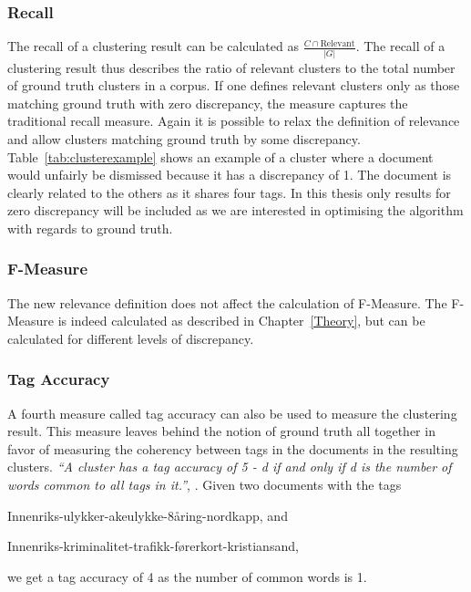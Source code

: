 \subsubsection{Recall}
The recall of a clustering result can be calculated as \(\frac{C \cap \text{Relevant}}{\vert G \vert}\). The recall of a clustering result thus describes the ratio of relevant clusters to the total number of ground truth clusters in a corpus. If one defines relevant clusters only as those matching ground truth with zero discrepancy, the measure captures the traditional recall measure. Again it is possible to relax the definition of relevance and allow clusters matching ground truth by some discrepancy. Table~\ref{tab:clusterexample} shows an example of a cluster where a document would unfairly be dismissed because it has a discrepancy of 1. The document is clearly related to the others as it shares four tags. In this thesis only results for zero discrepancy will be included as we are interested in optimising the algorithm with regards to ground truth.

\subsubsection{F-Measure}
The new relevance definition does not affect the calculation of F-Measure. The F-Measure is indeed calculated as described in Chapter~\ref{Theory}, but can be calculated for different levels of discrepancy.

\subsubsection{Tag Accuracy}
A fourth measure called tag accuracy can also be used to measure the clustering result. This measure leaves behind the notion of ground truth all together in favor of measuring the coherency between tags in the documents in the resulting clusters. \textit{``A cluster has a tag accuracy of 5 - d if and only if d is the number of words common to all tags in it.''}, \parencite[][71]{Moe2014compact}. Given two documents with the tags 
\begin{inparaenum}[\itshape 1\upshape)]
	\item Innenriks-ulykker-akeulykke-8åring-nordkapp, and
	\item Innenriks-kriminalitet-trafikk-førerkort-kristiansand,
\end{inparaenum}
we get a tag accuracy of 4 as the number of common words is 1.



